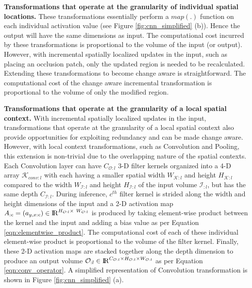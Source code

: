 \vspace{2mm}
\noindent \textbf{Transformations that operate at the granularity of individual  spatial locations.} These transformations essentially perform a $map(.)$ function on each individual activation value (see Figure \ref{fig:cnn_simplified} (b)).
Hence the output will have the same dimensions as input.
The computational cost incurred by these transformations is proportional to the volume of the input (or output).
However, with incremental spatially localized updates in the input, such as placing an occlusion patch, only the updated region is needed to be recalculated.
Extending these transformations to become change aware is straightforward.
The computational cost of the change aware incremental transformation is proportional to the volume of only the modified region.


\vspace{2mm}
\noindent \textbf{Transformations that operate at the granularity of a local spatial context.}
With incremental spatially localized updates in the input, transformations that operate at the granularity of a local spatial context also provide opportunities for exploiting redundancy and can be made change aware.
However, with local context transformations, such as Convolution and Pooling, this extension is non-trivial due to the overlapping nature of the spatial contexts.
Each Convolution layer can have $C_{\mathcal{O}:l}$ 3-D filter kernels organized into a 4-D array $\mathcal{K}_{conv:l}$ with each having a smaller spatial width $W_{\mathcal{K}:l}$ and height $H_{\mathcal{K}:l}$ compared to the width $W_{\mathcal{I}:l}$ and height $H_{\mathcal{I}:l}$ of the input volume $\mathcal{I}_{:l}$, but has the same depth $C_{\mathcal{I}:l}$.
During inference, $c^{th}$ filter kernel is strided along the width and height dimensions of the input and a 2-D activation map $A_{:c}=(a_{y,x:c})\in \mathcal{\rm I\!R}^{H_{\mathcal{O}:l} \times~ W_{\mathcal{O}:l}}$ is produced by taking element-wise product between the kernel and the input and adding a bias value as per Equation \ref{eqn:elementwise_product}.
The computational cost of each of these individual element-wise product is proportional to the volume of the filter kernel.
Finally, these 2-D activation maps are stacked together along the depth dimension to produce an output volume $\mathcal{O}_{:l} \in \mathcal{\rm I\!R}^{C_{\mathcal{O}:l} \times H_{\mathcal{O}:l} \times W_{\mathcal{O}:l}}$ as per Equation \ref{eqn:conv_operator}.
A simplified representation of Convolution transformation is shown in Figure \ref{fig:cnn_simplified} (a).


